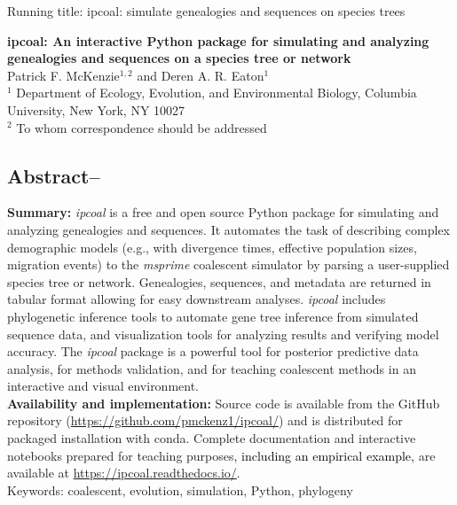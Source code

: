 \documentclass[11pt]{article}
\begin{document}
\noindent Running title: ipcoal: simulate genealogies and sequences on species trees\\

\begin{center}
{\bf \Large 
ipcoal: An interactive Python package for simulating and analyzing genealogies and sequences on a species tree or network
}\\[0.25cm]

Patrick F. McKenzie$^{1, 2}$ and Deren A. R. Eaton$^{1}$\\[0.25cm]

$^{1}$ Department of Ecology, Evolution, and Environmental Biology, Columbia University, New York, NY 10027 \\
$^{2}$ To whom correspondence should be addressed

\end{center}
\noindent

\subsection*{Abstract--}
\textbf{Summary:} \emph{ipcoal} is a free and open source Python package for simulating and analyzing genealogies and sequences. It automates the task of describing complex demographic models (e.g., with divergence times, effective population sizes, migration events) to the \emph{msprime} coalescent simulator by parsing a user-supplied species tree or network. Genealogies, sequences, and metadata are returned in tabular format allowing for easy downstream analyses. \emph{ipcoal} includes phylogenetic inference tools to automate gene tree inference from simulated sequence data, and visualization tools for analyzing results and verifying model accuracy. The \emph{ipcoal} package is a powerful tool for posterior predictive data analysis, for methods validation, and for teaching coalescent methods in an interactive and visual environment. \\

\noindent \textbf{Availability and implementation:} Source code is available from the GitHub repository (\url{https://github.com/pmckenz1/ipcoal/}) and is distributed for packaged installation with conda. Complete documentation and interactive notebooks prepared for teaching purposes\textcolor{black}{, including an empirical example,} are available at \url{https://ipcoal.readthedocs.io/}.\\

\noindent Keywords: coalescent, evolution, simulation, Python, phylogeny
\end{document}
